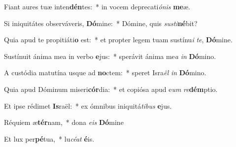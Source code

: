 ﻿\item Fiant aures tuæ inten\textbf{dén}tes:~* in vocem deprecati\textit{ó}\textit{nis} \textbf{me}æ.

\item Si iniquitátes observáveris, \textbf{Dó}mine:~* Dómine, quis \textit{su}\textit{sti}\textbf{né}bit?

\item Quia apud te propitiáti\textbf{o} est:~* et propter legem tuam sustínu\textit{i} \textit{te}, \textbf{Dó}mine.

\item Sustínuit ánima mea in verbo \textbf{e}jus:~* sperávit ánima me\textit{a} \textit{in} \textbf{Dó}mino.

\item A custódia matutína usque ad \textbf{no}ctem:~* speret Isra\textit{ël} \textit{in} \textbf{Dó}mino.

\item Quia apud Dóminum miseri\textbf{cór}dia:~* et copiósa apud e\textit{um} \textit{re}\textbf{dém}ptio.

\item Et ipse rédimet \textbf{Is}raël:~* ex ómnibus iniquitá\textit{ti}\textit{bus} \textbf{e}jus.

\item Réquiem æ\textbf{tér}nam,~* dona \textit{eis} \textbf{Dó}mine

\item Et lux per\textbf{pé}tua,~* lu\textit{céat} \textbf{é}is.
